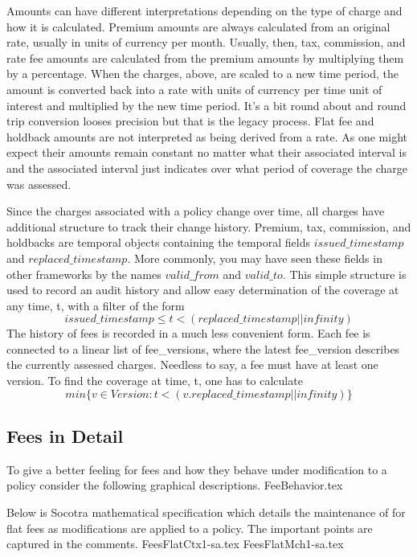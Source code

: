 Amounts can have different interpretations depending on the type of charge and how it is calculated.
Premium amounts are always calculated from an original rate, usually in units of currency per month. Usually, then,
tax, commission, and rate fee amounts are calculated from the premium amounts by multiplying them by a percentage.
When the charges, above, are scaled to a new time period, the amount is converted back into
a rate with units of currency per time unit of interest and multiplied by the new time period. It's a bit
round about and round trip conversion looses precision but that is the legacy process. Flat fee and holdback amounts are
not interpreted as being derived from a rate. As one might expect their amounts remain constant no
matter what their associated interval is and the associated interval just indicates over what period of coverage the
charge was assessed.

Since the charges associated with a policy change over time, all charges have additional structure to track their
change history. Premium, tax, commission, and holdbacks are temporal objects containing the temporal fields $issued\_timestamp$ and $replaced\_timestamp$.
More commonly, you may have seen these fields in other frameworks by the names $valid\_from$ and
$valid\_to$. This simple structure is used to record an audit history and allow easy determination of the
coverage at any time, t, with a filter of the form
\begin{equation*}
issued\_timestamp \leq t < (replaced\_timestamp || infinity)
\end{equation*}
The history of fees is recorded in a much less convenient form. Each fee is connected to a linear list of fee\_versions, where
the latest fee\_version describes the currently assessed charges. Needless to say, a fee must have at least one version.
To find the coverage at time, t, one has to calculate
\begin{equation*}
min \lbrace v \in Version : t < (v.replaced\_timestamp || infinity) \rbrace
\end{equation*}

\subsection{Fees in Detail}
To give a better feeling for fees and how they behave under modification to a policy consider the following
graphical descriptions.
{FeeBehavior.tex}
\newpage

Below is Socotra mathematical specification which details the maintenance of for flat fees as modifications are applied to a
policy. The important points are captured in the comments.
{FeesFlatCtx1-sa.tex}
{FeesFlatMch1-sa.tex}

